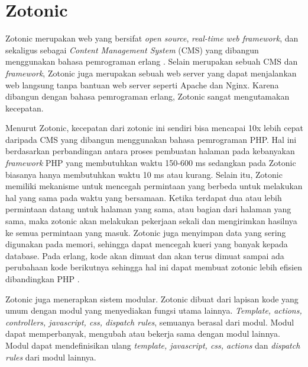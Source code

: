 \section{Zotonic}

Zotonic merupakan web yang bersifat \textit{open source}, \textit{real-time web framework}, dan sekaligus sebagai \textit{Content Management System} (CMS) yang dibangun menggunakan bahasa pemrograman erlang \citep{zotonic.overview}. Selain merupakan sebuah CMS dan \textit{framework}, Zotonic juga merupakan sebuah web server yang dapat menjalankan web langsung tanpa bantuan web server seperti Apache dan Nginx. Karena dibangun dengan bahasa pemrograman erlang, Zotonic sangat mengutamakan kecepatan.

Menurut Zotonic, kecepatan dari zotonic ini sendiri bisa mencapai 10x lebih cepat daripada CMS yang dibangun menggunakan bahasa pemrograman PHP. Hal ini berdasarkan perbandingan antara proses pembuatan halaman pada kebanyakan \textit{framework} PHP yang membutuhkan waktu 150-600 ms sedangkan pada Zotonic biasanya hanya membutuhkan waktu 10 ms atau kurang. Selain itu, Zotonic memiliki mekanisme untuk mencegah permintaan yang berbeda untuk melakukan hal yang sama pada waktu yang bersamaan. Ketika terdapat dua atau lebih permintaan datang untuk halaman yang sama, atau bagian dari halaman yang sama, maka zotonic akan melakukan pekerjaan sekali dan mengirimkan hasilnya ke semua permintaan yang masuk. Zotonic juga menyimpan data yang sering digunakan pada memori, sehingga dapat mencegah kueri yang banyak kepada database. Pada erlang, kode akan dimuat dan akan terus dimuat sampai ada perubahaan kode berikutnya sehingga hal ini dapat membuat zotonic lebih efisien dibandingkan PHP \citep{zotonic.speed}.

Zotonic juga menerapkan sistem modular. Zotonic dibuat dari lapisan kode yang umum dengan modul yang menyediakan fungsi utama lainnya. \textit{Template, actions, controllers, javascript, css, dispatch rules}, semuanya berasal dari modul. Modul dapat memperbanyak, mengubah atau bekerja sama dengan modul lainnya. Modul dapat mendefinisikan ulang \textit{template, javascript, css, actions} dan \textit{dispatch rules} dari modul lainnya.

